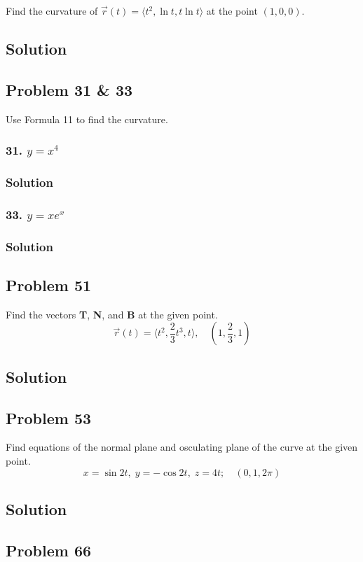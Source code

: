\documentclass{article}
\newcommand{\rvec}{\vec{r}(t)}
\begin{document}
Find the curvature of $\rvec = \langle{t^2, \ln t, t\ln t}\rangle$ at the point $(1, 0, 0)$.

\subsection*{Solution}
\subsection*{Problem 31 \& 33}

Use Formula 11 to find the curvature.

\subsubsection*{31. $y = x^4$}
\subsubsection*{Solution}
\subsubsection*{33. $y = xe^x$}
\subsubsection*{Solution}
\subsection*{Problem 51}
Find the vectors \textbf{T}, \textbf{N}, and \textbf{B} at the given point.
\[
    \rvec = \langle{t^2, \frac{2}{3}t^3, t}\rangle, \quad (1, \frac{2}{3}, 1)
\]
\subsection*{Solution}
\subsection*{Problem 53}

Find equations of the normal plane and osculating plane of the curve at the given point.
\[
    x = \sin{2t},\; y = -\cos{2t},\; z = 4t; \quad (0, 1, 2\pi)
\]

\subsection*{Solution}
\subsection*{Problem 66}
\end{document}
